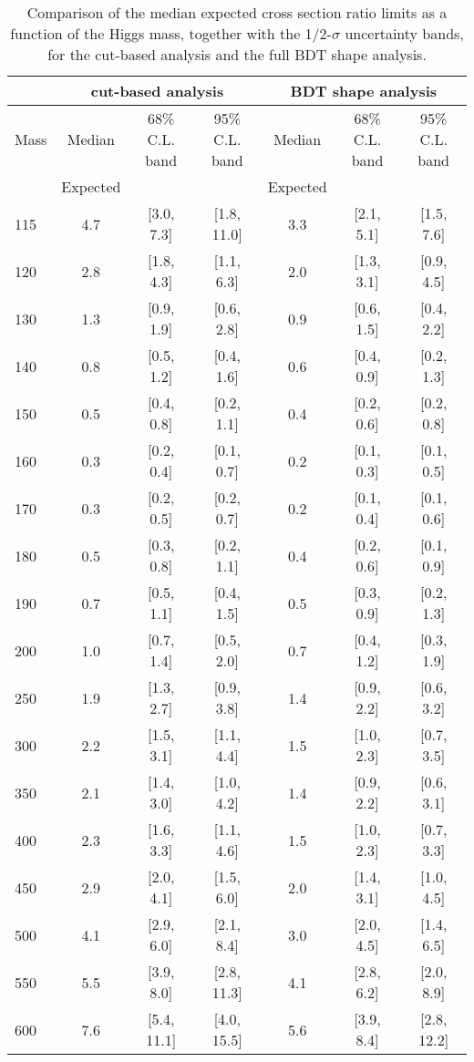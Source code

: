 \begin{table}[!ht]
\begin{center}
{\normalsize
\begin{tabular}{|l|c|c|c|c|c|c|}
\hline
      &  \multicolumn{3}{c|}{cut-based analysis} &\multicolumn{3}{c|}{BDT shape analysis} \\
\hline
Mass  &  Median      &     68\% C.L. band &  95\% C.L. band &  Median	   &	 68\% C.L. band &  95\% C.L. band\\
      &  Expected    &                    &                 &  Expected    &			&		 \\
\hline
115 &  4.7 & [3.0, 7.3] & [1.8, 11.0] &  3.3 & [2.1, 5.1] & [1.5, 7.6] \\
120 &  2.8 & [1.8, 4.3] & [1.1, 6.3]  &  2.0 & [1.3, 3.1] & [0.9, 4.5] \\
130 &  1.3 & [0.9, 1.9] & [0.6, 2.8]  &  0.9 & [0.6, 1.5] & [0.4, 2.2] \\
140 &  0.8 & [0.5, 1.2] & [0.4, 1.6]  &  0.6 & [0.4, 0.9] & [0.2, 1.3] \\
150 &  0.5 & [0.4, 0.8] & [0.2, 1.1]  &  0.4 & [0.2, 0.6] & [0.2, 0.8] \\
160 &  0.3 & [0.2, 0.4] & [0.1, 0.7]  &  0.2 & [0.1, 0.3] & [0.1, 0.5] \\
170 &  0.3 & [0.2, 0.5] & [0.2, 0.7]  &  0.2 & [0.1, 0.4] & [0.1, 0.6] \\
180 &  0.5 & [0.3, 0.8] & [0.2, 1.1]  &  0.4 & [0.2, 0.6] & [0.1, 0.9] \\
190 &  0.7 & [0.5, 1.1] & [0.4, 1.5]  &  0.5 & [0.3, 0.9] & [0.2, 1.3] \\
200 &  1.0 & [0.7, 1.4] & [0.5, 2.0]  &  0.7 & [0.4, 1.2] & [0.3, 1.9] \\
250 &  1.9 & [1.3, 2.7] & [0.9, 3.8]  &  1.4 & [0.9, 2.2] & [0.6, 3.2] \\
300 &  2.2 & [1.5, 3.1] & [1.1, 4.4]  &  1.5 & [1.0, 2.3] & [0.7, 3.5] \\
350 &  2.1 & [1.4, 3.0] & [1.0, 4.2]  &  1.4 & [0.9, 2.2] & [0.6, 3.1] \\
400 &  2.3 & [1.6, 3.3] & [1.1, 4.6]  &  1.5 & [1.0, 2.3] & [0.7, 3.3] \\
450 &  2.9 & [2.0, 4.1] & [1.5, 6.0]  &  2.0 & [1.4, 3.1] & [1.0, 4.5] \\
500 &  4.1 & [2.9, 6.0] & [2.1, 8.4]  &  3.0 & [2.0, 4.5] & [1.4, 6.5] \\
550 &  5.5 & [3.9, 8.0] & [2.8, 11.3] &  4.1 & [2.8, 6.2] & [2.0, 8.9] \\
600 &  7.6 & [5.4, 11.1]& [4.0, 15.5] &  5.6 & [3.9, 8.4] & [2.8, 12.2]\\
\hline
\end{tabular}
}
\caption{Comparison of the median expected cross section ratio limits as a function 
of the Higgs mass, together with the 1/2-$\sigma$ uncertainty bands, for the cut-based analysis 
and the full BDT shape analysis.}
\label{tab:mva_shapevscuts}
\end{center}
\end{table}

